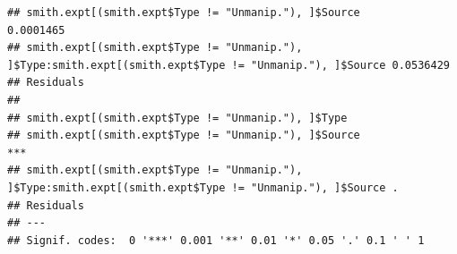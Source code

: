 \documentclass[]{article}
\begin{document}
\begin{verbatim}
## smith.expt[(smith.expt$Type != "Unmanip."), ]$Source                                                    0.0001465
## smith.expt[(smith.expt$Type != "Unmanip."), ]$Type:smith.expt[(smith.expt$Type != "Unmanip."), ]$Source 0.0536429
## Residuals                                                                                                        
##                                                                                                            
## smith.expt[(smith.expt$Type != "Unmanip."), ]$Type                                                         
## smith.expt[(smith.expt$Type != "Unmanip."), ]$Source                                                    ***
## smith.expt[(smith.expt$Type != "Unmanip."), ]$Type:smith.expt[(smith.expt$Type != "Unmanip."), ]$Source .  
## Residuals                                                                                                  
## ---
## Signif. codes:  0 '***' 0.001 '**' 0.01 '*' 0.05 '.' 0.1 ' ' 1
\end{verbatim}
\end{document}
